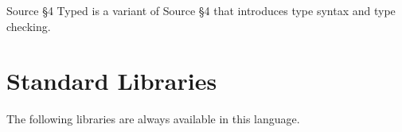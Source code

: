





Source \S 4 Typed is a variant of Source \S 4 that introduces type syntax and type checking.



























\section{Standard Libraries}

The following libraries are always available in this language.

















\newpage



\newpage



\newpage



    
